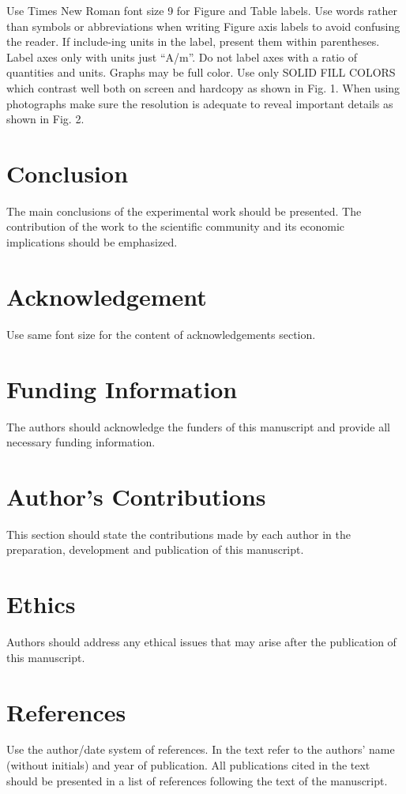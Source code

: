 \documentclass[fleqn,10pt]{thescipub} %
\begin{document}
Use Times New Roman font size 9 for Figure and Table labels. Use words rather than symbols or abbreviations when writing Figure axis labels to avoid confusing the reader. If include-ing units in the label, present them within parentheses. Label axes only with units just “A/m”. Do not label axes with a ratio of quantities and units. Graphs may be full color. Use only SOLID FILL COLORS which contrast well both on screen and hardcopy as shown in Fig. 1. When using photographs make sure the resolution is adequate to reveal important details as shown in Fig. 2.

\section{Conclusion}
The main conclusions of the experimental work should be presented. The contribution of the work to the scientific community and its economic implications should be emphasized.

\section{Acknowledgement}
Use same font size for the content of acknowledgements section.

\section{Funding Information}
The authors should acknowledge the funders of this manuscript and provide all necessary funding information.

\section{Author’s Contributions}
This section should state the contributions made by each author in the preparation, development and publication of this manuscript.

\section{Ethics}
Authors should address any ethical issues that may arise after the publication of this manuscript.


\section{References}
Use the author/date system of references. In the text refer to the authors’ name (without initials) and year of publication. All publications cited in the text should be presented in a list of references following the text of the manuscript.
\end{document}
